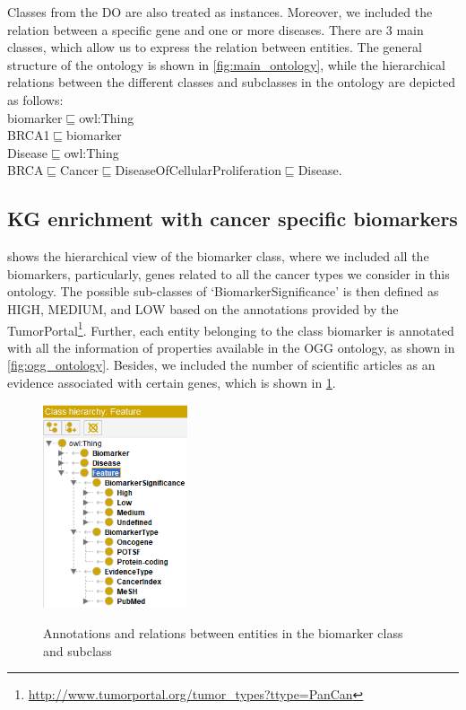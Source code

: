 \hspace*{3.5mm} Classes from the DO are also treated as instances. Moreover, we included  the relation between a specific gene and one or more diseases. There are 3 main classes, which allow us to express the relation between entities. The general structure of the ontology is shown in \cref{fig:main_ontology}, while the hierarchical relations between the different classes and subclasses in the ontology are depicted as follows: \\

\vspace{-4mm}
{\scriptsize \noindent biomarker$\sqsubseteq$owl:Thing \\
BRCA1$\sqsubseteq$biomarker\\
Disease$\sqsubseteq$owl:Thing\\
BRCA$\sqsubseteq$Cancer$\sqsubseteq$DiseaseOfCellularProliferation$\sqsubseteq$Disease.}\\
\vspace{-4mm}


\subsection{KG enrichment with cancer specific biomarkers} %
 shows the hierarchical view of the biomarker class, where we included all the biomarkers, particularly, genes related to all the cancer types we consider in this ontology. The possible sub-classes of `BiomarkerSignificance' is then defined as HIGH, MEDIUM, and LOW based on the annotations provided by the TumorPortal\footnote{\url{http://www.tumorportal.org/tumor_types?ttype=PanCan}}. Further, each entity belonging to the class biomarker is annotated with all the information of properties available in the OGG ontology, as shown in \cref{fig:ogg_ontology}. Besides, we included the number of scientific articles as an evidence associated with certain genes, which is shown in \cref{fig:biomarker_subclass}.

\begin{figure}[h]
	\centering
		\includegraphics[width=0.3\linewidth,height=60mm]{images/feature_class.png}
        \label{fig:biomarker_subclass}
	\caption{Annotations and relations between entities in the biomarker class and subclass}
	\vspace{-2mm}
\end{figure}

